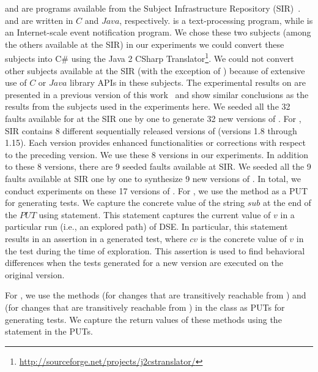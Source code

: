  and  are programs available from the Subject Infrastructure Repository (SIR)~\cite{doESE05}.  and  are written in $C$ and $Java$, respectively.  is a text-processing program, while  is an Internet-scale event notification program. We chose these two subjects (among the others available at the SIR) in our experiments we could convert these subjects into C\# using the Java 2 CSharp Translator\footnote{\url{http://sourceforge.net/projects/j2cstranslator/}}. We could not convert other subjects available at the SIR (with the exception of ) because of extensive use of $C$ or $Java$ library APIs in these subjects. The experimental results on  are presented in a previous version of this work~\cite{taneja09:guided} and show similar conclusions as the results from the subjects used in the experiments here. We seeded all the 32 faults available for  at the SIR one by one to generate 32 new versions of . For , SIR contains 8 different sequentially released versions of  (versions 1.8 through 1.15). Each version provides enhanced functionalities or corrections with respect to the preceding version. We use these 8 versions in our experiments. In addition to these 8 versions, there are 9 seeded faults available at SIR. We seeded all the 9 faults available at SIR one by one to synthesize 9 new versions of . 
In total, we conduct experiments on these 17 versions of . For , we use the  method as a PUT for generating tests. We capture the concrete value of the string $sub$ at the end of the $PUT$ using  statement. This statement captures the current value of $v$ in a particular run
(i.e., an explored path) of DSE. In particular, this statement
results in an assertion  in a generated test, where $cv$ is the concrete value of $v$ in the test during the time of exploration. 
This assertion is used to find behavioral differences when the tests generated for a new version are executed on the original version.

For , we use the methods  (for changes that are transitively reachable from ) and  (for changes that are transitively reachable from ) in the class  as PUTs for generating tests. We capture the return values of these methods using the  statement 
in the PUTs.

